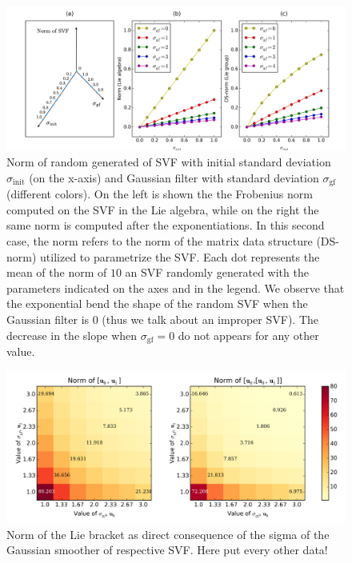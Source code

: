 \begin{figure}[!ht]
	\hspace{-1.5cm}
	\includegraphics[scale=0.54]{figures/SVF_sigma_means_comparisons.png}
	\caption{Norm of random generated of SVF with initial standard deviation $\sigma_{\text{init}}$ (on the x-axis) and Gaussian filter with standard deviation $\sigma_{\text{gf}}$ (different colors). On the left is shown the the Frobenius norm computed on the SVF in the Lie algebra, while on the right the same norm is computed after the exponentiations. In this second case, the norm refers to the norm of the matrix data structure (DS-norm) utilized to parametrize the SVF. Each dot represents the mean of the norm of $10$ an SVF randomly generated with the parameters indicated on the axes and in the legend. We observe that the exponential bend the shape of the random SVF when the Gaussian filter is $0$ (thus we talk about an improper SVF). The decrease in the slope when $\sigma_{\text{gf}}=0$ do not appears for any other value.}
	\label{fig:SVF_sigma_means_comparisons}
\end{figure}

\begin{figure}[!ht]
	\hspace{-1cm}
	\includegraphics[scale=0.6]{figures/SVF_image_scale_bracket_versus_gaussian.png}
	\caption{Norm of the Lie bracket as direct consequence of the sigma of the Gaussian smoother of respective SVF. Here put every other data!}
	\label{fig:SVF_image_scale_bracket_versus_gaussian}
\end{figure}





